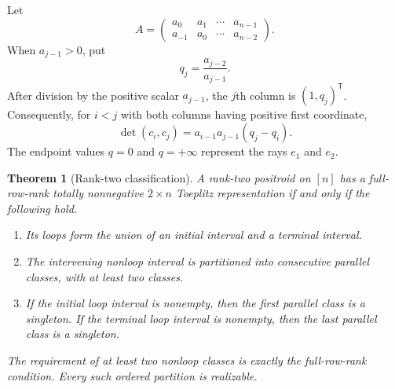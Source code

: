\documentclass{amsart}
\numberwithin{equation}{section}
\newtheorem{theorem}{Theorem}
\theoremstyle{definition}
\theoremstyle{remark}
\newcommand{\transpose}{\mathsf T}
\begin{document}
Let
\begin{equation}\label{eq:rank2A}
 A=
 \begin{pmatrix}
 a_0&a_1&\cdots&a_{n-1}\\
 a_{-1}&a_0&\cdots&a_{n-2}
 \end{pmatrix}.
\end{equation}
When $a_{j-1}>0$, put
\begin{equation}\label{eq:qrank2}
 q_j=\frac{a_{j-2}}{a_{j-1}}.
\end{equation}
After division by the positive scalar $a_{j-1}$, the $j$th column is $(1,q_j)^{\transpose}$.  Consequently, for $i<j$ with both columns having positive first coordinate,
\begin{equation}\label{eq:rank2minor}
 \det(c_i,c_j)=a_{i-1}a_{j-1}(q_j-q_i).
\end{equation}
The endpoint values $q=0$ and $q=+\infty$ represent the rays $e_1$ and $e_2$.

\begin{theorem}[Rank-two classification]\label{thm:rank2}
A rank-two positroid on $[n]$ has a full-row-rank totally nonnegative $2\times n$ Toeplitz representation if and only if the following hold.
\begin{enumerate}
\item Its loops form the union of an initial interval and a terminal interval.
\item The intervening nonloop interval is partitioned into consecutive parallel classes, with at least two classes.
\item If the initial loop interval is nonempty, then the first parallel class is a singleton.  If the terminal loop interval is nonempty, then the last parallel class is a singleton.
\end{enumerate}
The requirement of at least two nonloop classes is exactly the full-row-rank condition.  Every such ordered partition is realizable.
\end{theorem}
\end{document}
